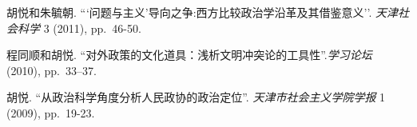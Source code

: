 胡悦和朱毓朝. ```问题与主义'导向之争:西方比较政治学沿革及其借鉴意义''. 
\emph{天津社会科学} 3 (2011), pp.~46-50.

程同顺和胡悦. ``对外政策的文化道具：浅析文明冲突论的工具性''.\emph{学习论坛} (2010), pp.~33--37.

胡悦. ``从政治科学角度分析人民政协的政治定位''.
\emph{天津市社会主义学院学报} 1 (2009), pp.~19-23.



